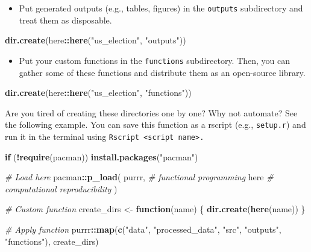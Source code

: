 \documentclass[
]{book}
\newenvironment{Shaded}{\begin{snugshade}}{\end{snugshade}}
\newcommand{\CommentTok}[1]{\textcolor[rgb]{0.56,0.35,0.01}{\textit{#1}}}
\newcommand{\ControlFlowTok}[1]{\textcolor[rgb]{0.13,0.29,0.53}{\textbf{#1}}}
\newcommand{\KeywordTok}[1]{\textcolor[rgb]{0.13,0.29,0.53}{\textbf{#1}}}
\newcommand{\NormalTok}[1]{#1}
\newcommand{\OperatorTok}[1]{\textcolor[rgb]{0.81,0.36,0.00}{\textbf{#1}}}
\newcommand{\StringTok}[1]{\textcolor[rgb]{0.31,0.60,0.02}{#1}}
\providecommand{\tightlist}{%
  \setlength{\itemsep}{0pt}\setlength{\parskip}{0pt}}
\begin{document}
\begin{itemize}
\tightlist
\item
  Put generated outputs (e.g., tables, figures) in the \texttt{outputs} subdirectory and treat them as disposable.
\end{itemize}

\begin{Shaded}
\begin{Highlighting}[]
\KeywordTok{dir.create}\NormalTok{(here}\OperatorTok{::}\KeywordTok{here}\NormalTok{(}\StringTok{"us\_election"}\NormalTok{, }\StringTok{"outputs"}\NormalTok{))}
\end{Highlighting}
\end{Shaded}

\begin{itemize}
\tightlist
\item
  Put your custom functions in the \texttt{functions} subdirectory. Then, you can gather some of these functions and distribute them as an open-source library.
\end{itemize}

\begin{Shaded}
\begin{Highlighting}[]
\KeywordTok{dir.create}\NormalTok{(here}\OperatorTok{::}\KeywordTok{here}\NormalTok{(}\StringTok{"us\_election"}\NormalTok{, }\StringTok{"functions"}\NormalTok{))}
\end{Highlighting}
\end{Shaded}

Are you tired of creating these directories one by one? Why not automate? See the following example. You can save this function as a rscript (e.g., \texttt{setup.r}) and run it in the terminal using \texttt{Rscript\ \textless{}script\ name\textgreater{}.}

\begin{Shaded}
\begin{Highlighting}[]
\ControlFlowTok{if}\NormalTok{ (}\OperatorTok{!}\KeywordTok{require}\NormalTok{(pacman)) }\KeywordTok{install.packages}\NormalTok{(}\StringTok{"pacman"}\NormalTok{)}

\CommentTok{\# Load here}
\NormalTok{pacman}\OperatorTok{::}\KeywordTok{p\_load}\NormalTok{(}
\NormalTok{  purrr, }\CommentTok{\# functional programming}
\NormalTok{  here }\CommentTok{\# computational reproducibility}
\NormalTok{)}

\CommentTok{\# Custom function}
\NormalTok{create\_dirs \textless{}{-}}\StringTok{ }\ControlFlowTok{function}\NormalTok{(name) \{}
  \KeywordTok{dir.create}\NormalTok{(}\KeywordTok{here}\NormalTok{(name))}
\NormalTok{\}}

\CommentTok{\# Apply function }
\NormalTok{purrr}\OperatorTok{::}\KeywordTok{map}\NormalTok{(}\KeywordTok{c}\NormalTok{(}\StringTok{"data"}\NormalTok{, }\StringTok{"processed\_data"}\NormalTok{, }\StringTok{"src"}\NormalTok{, }\StringTok{"outputs"}\NormalTok{, }\StringTok{"functions"}\NormalTok{), create\_dirs)}
\end{Highlighting}
\end{Shaded}
\end{document}

